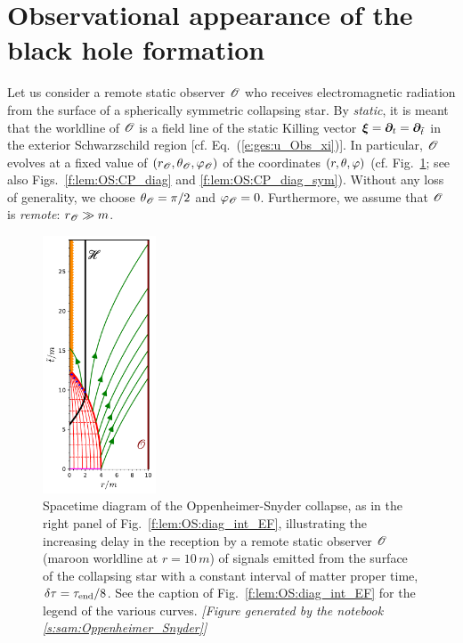 

\section{Observational appearance of the black hole formation} \label{s:lem:obs}

Let us consider a remote static observer $\mathscr{O}$ who receives electromagnetic
radiation from the surface of a spherically symmetric collapsing star. By
\emph{static}, it is meant
that the worldline of $\mathscr{O}$ is a field line of the static Killing vector
$\bm{\xi} = \bm{\partial}_t = \bm{\partial}_{{\tilde t}}$ in the exterior Schwarzschild region
[cf. Eq.~(\ref{e:ges:u_Obs_xi})]. In particular, $\mathscr{O}$ evolves at a fixed
value of $(r_{\mathscr{O}},\theta_{\mathscr{O}},\varphi_{\mathscr{O}})$ of the coordinates $(r,\theta,\varphi)$
(cf. Fig.~\ref{f:lem:OS:diag_delay}; see also Figs.~\ref{f:lem:OS:CP_diag}
and \ref{f:lem:OS:CP_diag_sym}).
Without any loss of generality,
we choose $\theta_{\mathscr{O}} = \pi/2$ and $\varphi_{\mathscr{O}} = 0$.
Furthermore, we assume that $\mathscr{O}$ is \emph{remote}: $r_{\mathscr{O}} \gg m$.

\begin{figure}
\centerline{
\includegraphics[width=0.3\textwidth]{lem_OS_diag_delay.pdf}
}
\caption[]{\label{f:lem:OS:diag_delay} \footnotesize
Spacetime diagram of the Oppenheimer-Snyder collapse,
as in the right panel of Fig.~\ref{f:lem:OS:diag_int_EF}, illustrating
the increasing delay in the reception by a remote static observer $\mathscr{O}$
(maroon worldline at $r=10 \, m$)
of signals emitted from the
surface of the collapsing star with a constant interval of matter proper time,
$\delta\tau = \tau_{\rm end}/8$.
See the caption of Fig.~\ref{f:lem:OS:diag_int_EF} for the legend of the various
curves.
\textsl{[Figure generated by the notebook \ref{s:sam:Oppenheimer_Snyder}]}
}
\end{figure}

